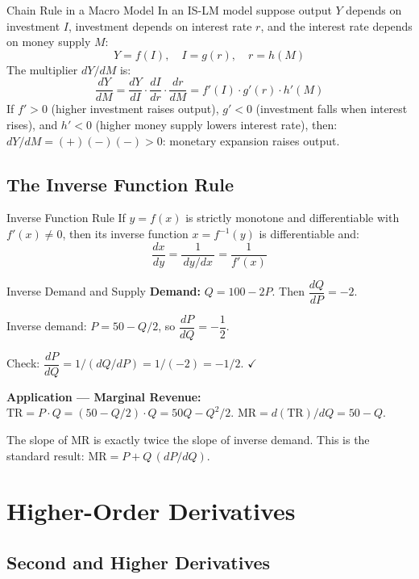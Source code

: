 \documentclass[12pt, a4paper]{article}
\theoremstyle{definition}
\newcommand{\ddd}[2]{\dfrac{d#1}{d#2}}
\begin{document}
\begin{exbox}{Chain Rule in a Macro Model}
In an IS-LM model suppose output $Y$ depends on investment $I$, investment
depends on interest rate $r$, and the interest rate depends on money supply $M$:
\[
  Y = f(I),\quad I = g(r),\quad r = h(M)
\]
The multiplier $dY/dM$ is:
\[
  \ddd{Y}{M} = \ddd{Y}{I}\cdot\ddd{I}{r}\cdot\ddd{r}{M}
             = f'(I)\cdot g'(r)\cdot h'(M)
\]
If $f'>0$ (higher investment raises output), $g'<0$ (investment falls when
interest rises), and $h'<0$ (higher money supply lowers interest rate), then:
$dY/dM = (+)(-)(-) > 0$: monetary expansion raises output.
\end{exbox}

\subsection{The Inverse Function Rule}

\begin{thmbox}{Inverse Function Rule}
If $y = f(x)$ is strictly monotone and differentiable with $f'(x) \neq 0$,
then its inverse function $x = f^{-1}(y)$ is differentiable and:
\[
  \ddd{x}{y} = \frac{1}{\,dy/dx\,} = \frac{1}{f'(x)}
\]
\end{thmbox}

\begin{exbox}{Inverse Demand and Supply}
\textbf{Demand:} $Q = 100 - 2P$.  Then $\dfrac{dQ}{dP} = -2$.

Inverse demand: $P = 50 - Q/2$, so $\dfrac{dP}{dQ} = -\dfrac{1}{2}$.

Check: $\dfrac{dP}{dQ} = 1\big/(dQ/dP) = 1/(-2) = -1/2$. $\checkmark$

\textbf{Application --- Marginal Revenue:}
$\text{TR} = P \cdot Q = (50-Q/2)\cdot Q = 50Q - Q^2/2$.
$\text{MR} = d(\text{TR})/dQ = 50 - Q$.

The slope of MR is exactly twice the slope of inverse demand.
This is the standard result: $\text{MR} = P + Q\,(dP/dQ)$.
\end{exbox}

\section{Higher-Order Derivatives}

\subsection{Second and Higher Derivatives}
\end{document}
